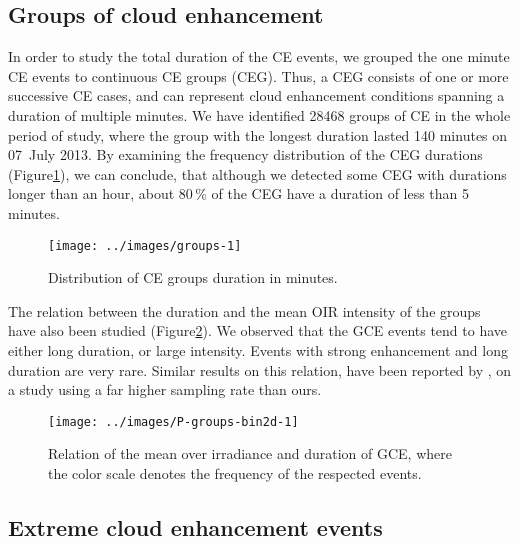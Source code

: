 \documentclass[preprint, 5p,
authoryear]{elsarticle} %
\begin{document}
\hypertarget{groups-of-cloud-enhancement}{%
\subsection{Groups of cloud
enhancement}\label{groups-of-cloud-enhancement}}

In order to study the total duration of the CE events, we grouped the
one minute CE events to continuous CE groups (CEG). Thus, a CEG consists
of one or more successive CE cases, and can represent cloud enhancement
conditions spanning a duration of multiple minutes. We have identified
28468 groups of CE in the whole period of study, where the group with
the longest duration lasted 140 minutes on 07~July 2013. By examining
the frequency distribution of the CEG durations
(Figure\nobreakspace{}\ref{fig:ceg-duration-distribution}), we can
conclude, that although we detected some CEG with durations longer than
an hour, about \(80\,\%\) of the CEG have a duration of less than 5
minutes.

\begin{figure}

{\centering \texttt{[image: ../images/groups-1]} 

}

\caption{Distribution of CE groups duration in minutes.}\label{fig:ceg-duration-distribution}
\end{figure}

The relation between the duration and the mean OIR intensity of the
groups have also been studied (Figure\nobreakspace{}\ref{fig:group-2d}).
We observed that the GCE events tend to have either long duration, or
large intensity. Events with strong enhancement and long duration are
very rare. Similar results on this relation, have been reported by
\citet{Zhang2018}, on a study using a far higher sampling rate than
ours.

\begin{figure}

{\centering \texttt{[image: ../images/P-groups-bin2d-1]} 

}

\caption{Relation of the mean over irradiance and duration of GCE, where the color scale denotes the frequency of the respected events.}\label{fig:group-2d}
\end{figure}

\hypertarget{extreme-cloud-enhancement-events}{%
\subsection{Extreme cloud enhancement
events}\label{extreme-cloud-enhancement-events}}
\end{document}
